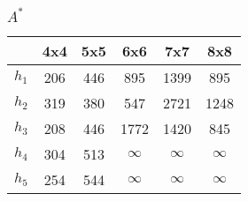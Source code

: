 \documentclass[%
    final,
    reprint,
    notitlepage,
    narroweqnarray,
    inline,
    twoside,
    invited
    ]{ieee}
\begin{document}
\subsubsection{$A^*$}
\begin{tabular}{l|c|c|c|c|c}
   & 4x4 & 5x5 & 6x6 & 7x7 & 8x8 \\
  \hline
  $h_1$ & 206 & 446 & 895 & 1399 & 895 \\
  $h_2$ & 319 & 380 & 547 & 2721 & 1248 \\
  $h_3$ & 208 & 446 & 1772 & 1420 & 845 \\
  $h_4$ & 304 & 513 & $\infty$ & $\infty$ & $\infty$ \\
  $h_5$ & 254 & 544 & $\infty$ & $\infty$ & $\infty$ \\
\end{tabular}

\end{document}
